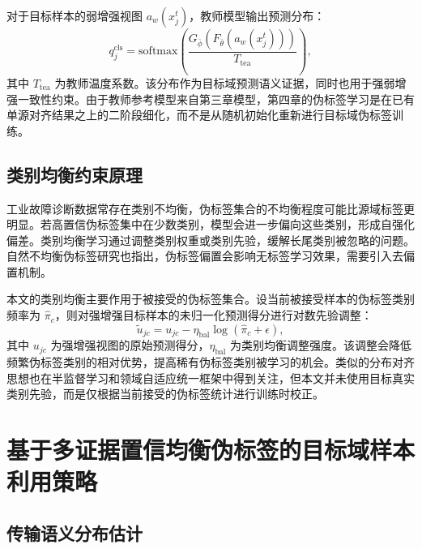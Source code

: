 \documentclass{seuthesis-2022}
\begin{document}
对于目标样本的弱增强视图 $a_w(x_j^t)$，教师模型输出预测分布：
\begin{equation}
    q_j^{\mathrm{cls}}
    =
    \mathrm{softmax}
    \left(
    \frac{G_{\bar{\phi}}(F_{\bar{\theta}}(a_w(x_j^t)))}{T_{\mathrm{tea}}}
    \right),
\end{equation}
其中 $T_{\mathrm{tea}}$ 为教师温度系数。该分布作为目标域预测语义证据，同时也用于强弱增强一致性约束。由于教师参考模型来自第三章模型，第四章的伪标签学习是在已有单源对齐结果之上的二阶段细化，而不是从随机初始化重新进行目标域伪标签训练。

\subsection{类别均衡约束原理}

工业故障诊断数据常存在类别不均衡，伪标签集合的不均衡程度可能比源域标签更明显。若高置信伪标签集中在少数类别，模型会进一步偏向这些类别，形成自强化偏差。类别均衡学习通过调整类别权重或类别先验，缓解长尾类别被忽略的问题\cite{cui2019classbalanced}。自然不均衡伪标签研究也指出，伪标签偏置会影响无标签学习效果，需要引入去偏置机制\cite{wang2022debiaspl}。

本文的类别均衡主要作用于被接受的伪标签集合。设当前被接受样本的伪标签类别频率为 $\hat{\pi}_c$，则对强增强目标样本的未归一化预测得分进行对数先验调整：
\begin{equation}
    \tilde{u}_{jc}
    =
    u_{jc}
    -
    \eta_{\mathrm{bal}}\log(\hat{\pi}_c+\epsilon),
\end{equation}
其中 $u_{jc}$ 为强增强视图的原始预测得分，$\eta_{\mathrm{bal}}$ 为类别均衡调整强度。该调整会降低频繁伪标签类别的相对优势，提高稀有伪标签类别被学习的机会。类似的分布对齐思想也在半监督学习和领域自适应统一框架中得到关注\cite{berthelot2020remixmatch,berthelot2021adamatch}，但本文并未使用目标真实类别先验，而是仅根据当前接受的伪标签统计进行训练时校正。

\section{基于多证据置信均衡伪标签的目标域样本利用策略}
\subsection{传输语义分布估计}
\end{document}
